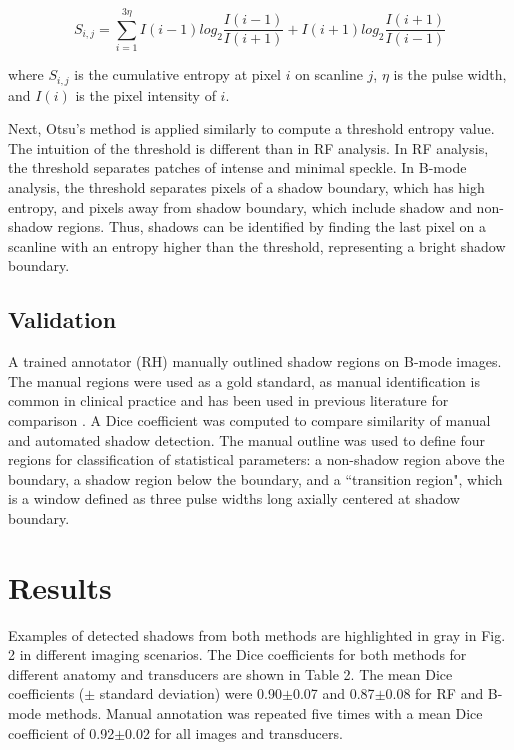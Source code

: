\documentclass[preprint,5p,authoryear]{elsarticle}
\begin{document}
\begin{equation}
S_{i,j} = \sum_{i=1}^{3\eta}I(i-1)log_{2}\frac{I(i-1)}{I(i+1)}+I(i+1)log_{2}\frac{I(i+1)}{I(i-1)}
\end{equation}

where $S_{i,j}$ is the cumulative entropy at pixel $i$ on scanline $j$, $\eta$ is the pulse width, and $I(i)$ is the pixel intensity of $i$.

Next, Otsu's method is applied similarly to compute a threshold entropy value. The intuition of the threshold is different than in RF analysis. In RF analysis, the threshold separates patches of intense and minimal speckle. In B-mode analysis, the threshold separates pixels of a shadow boundary, which has high entropy, and pixels away from shadow boundary, which include shadow and non-shadow regions. Thus, shadows can be identified by finding the last pixel on a scanline with an entropy higher than the threshold, representing a bright shadow boundary.


\subsection*{Validation}

A trained annotator (RH) manually outlined shadow regions on B-mode images. The manual regions were used as a gold standard, as manual identification is common in clinical practice and has been used in previous literature for comparison \citep{Hellier2010}. A Dice coefficient was computed to compare similarity of manual and automated shadow detection. The manual outline was used to define four regions for classification of statistical parameters: a non-shadow region above the boundary, a shadow region below the boundary, and a ``transition region", which is a window defined as three pulse widths long axially centered at shadow boundary.
%
\section*{Results}
\label{Results}
Examples of detected shadows from both methods are highlighted in gray in Fig. 2 in different imaging scenarios. The Dice coefficients for both methods for different anatomy and transducers are shown in Table 2. The mean Dice coefficients ($\pm$ standard deviation) were 0.90$\pm$0.07 and 0.87$\pm$0.08 for RF and B-mode methods. Manual annotation was repeated five times with a mean Dice coefficient of 0.92$\pm$0.02 for all images and transducers.
\end{document}
